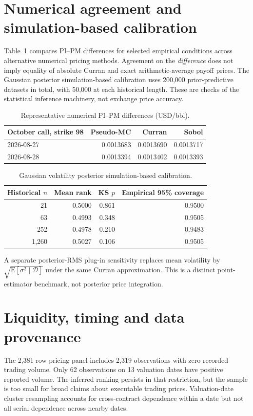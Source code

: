 \documentclass[10pt]{article}
\renewcommand{\thetable}{S\arabic{section}}
\begin{document}
\section{Numerical agreement and simulation-based calibration}
Table~\ref{tab:s2} compares PI--PM differences for selected empirical
conditions across alternative numerical pricing methods. Agreement on the
\emph{difference} does not imply equality of absolute Curran and exact
arithmetic-average payoff prices. The Gaussian posterior
simulation-based calibration uses 200,000 prior-predictive datasets in total,
with 50,000 at each historical length. These are checks of the statistical
inference machinery, not exchange price accuracy.

\begin{table}[htbp]\centering\small
\caption{Representative numerical PI--PM differences (USD/bbl).}\label{tab:s2}
\begin{tabular}{lrrr}\toprule
October call, strike 98 & Pseudo-MC & Curran & Sobol\\\midrule
2026-08-27 & 0.0013683 & 0.0013690 & 0.0013717\\
2026-08-28 & 0.0013394 & 0.0013402 & 0.0013393\\\bottomrule
\end{tabular}
\end{table}

\begin{table}[htbp]\centering\small
\renewcommand{\thetable}{S2b}
\caption{Gaussian volatility posterior simulation-based calibration.}
\label{tab:s2b}
\begin{tabular}{rrrr}\toprule
Historical $n$ & Mean rank & KS $p$ & Empirical 95\% coverage\\\midrule
21 & 0.5000 & 0.861 & 0.9500\\
63 & 0.4993 & 0.348 & 0.9505\\
252 & 0.4978 & 0.210 & 0.9483\\
1,260 & 0.5027 & 0.106 & 0.9505\\\bottomrule
\end{tabular}
\end{table}

\renewcommand{\thetable}{S\arabic{section}}
\noindent A separate posterior-RMS plug-in sensitivity replaces mean volatility
by $\sqrt{\mathrm E[\sigma^2\mid\mathcal D]}$ under the same Curran
approximation. This is a distinct point-estimator benchmark, not posterior
price integration.

\section{Liquidity, timing and data provenance}
The 2,381-row pricing panel includes 2,319 observations with zero recorded
trading volume. Only 62 observations on 13 valuation dates have positive
reported volume. The inferred ranking persists in that restriction, but
the sample is too small for broad claims about executable trading prices.
Valuation-date cluster resampling accounts for cross-contract dependence
within a date but not all serial dependence across nearby dates.
\end{document}
